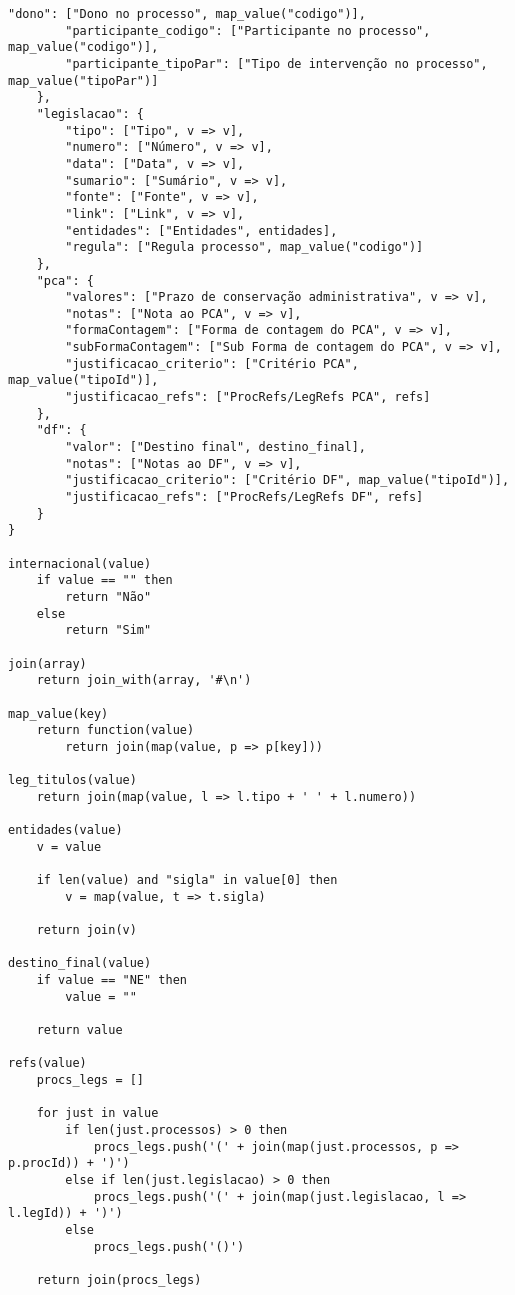 \begin{lstlisting}[language=pseudocode, caption=Algoritmo de conversão de \acrshort{json} para \acrshort{csv}]
        "dono": ["Dono no processo", map_value("codigo")],
        "participante_codigo": ["Participante no processo", map_value("codigo")],
        "participante_tipoPar": ["Tipo de intervenção no processo", map_value("tipoPar")]
    },
    "legislacao": {
        "tipo": ["Tipo", v => v],
        "numero": ["Número", v => v],
        "data": ["Data", v => v],
        "sumario": ["Sumário", v => v],
        "fonte": ["Fonte", v => v],
        "link": ["Link", v => v],
        "entidades": ["Entidades", entidades],
        "regula": ["Regula processo", map_value("codigo")]
    },
    "pca": {
        "valores": ["Prazo de conservação administrativa", v => v],
        "notas": ["Nota ao PCA", v => v],
        "formaContagem": ["Forma de contagem do PCA", v => v],
        "subFormaContagem": ["Sub Forma de contagem do PCA", v => v],
        "justificacao_criterio": ["Critério PCA", map_value("tipoId")],
        "justificacao_refs": ["ProcRefs/LegRefs PCA", refs]
    },
    "df": {
        "valor": ["Destino final", destino_final],
        "notas": ["Notas ao DF", v => v],
        "justificacao_criterio": ["Critério DF", map_value("tipoId")],
        "justificacao_refs": ["ProcRefs/LegRefs DF", refs]
    }
}

internacional(value)
    if value == "" then
        return "Não"
    else
        return "Sim"

join(array)
    return join_with(array, '#\n')

map_value(key)
    return function(value)
        return join(map(value, p => p[key]))

leg_titulos(value)
    return join(map(value, l => l.tipo + ' ' + l.numero))

entidades(value)
    v = value

    if len(value) and "sigla" in value[0] then
        v = map(value, t => t.sigla)

    return join(v)

destino_final(value)
    if value == "NE" then
        value = ""

    return value

refs(value)
    procs_legs = []

    for just in value
        if len(just.processos) > 0 then
            procs_legs.push('(' + join(map(just.processos, p => p.procId)) + ')')
        else if len(just.legislacao) > 0 then
            procs_legs.push('(' + join(map(just.legislacao, l => l.legId)) + ')')
        else
            procs_legs.push('()')

    return join(procs_legs)


\end{lstlisting}
